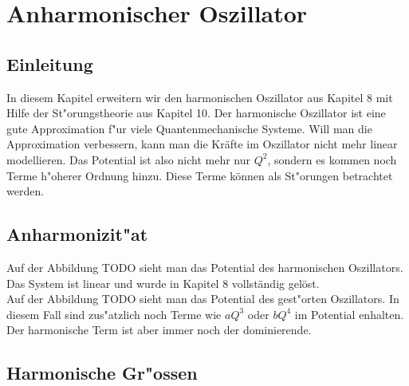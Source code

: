\chapter{Anharmonischer Oszillator\label{chapter:anharmonisch}}
\begin{refsection}

\newpage
\section{Einleitung}
In diesem Kapitel erweitern wir den harmonischen Oszillator aus Kapitel 8 mit Hilfe
der St"orungstheorie aus Kapitel 10. Der harmonische Oszillator ist eine gute
Approximation f"ur viele Quantenmechanische Systeme. Will man die Approximation
verbessern, kann man die Kräfte im Oszillator nicht mehr linear modellieren. Das
Potential ist also nicht mehr nur $Q^2$, sondern es kommen noch Terme h"oherer Ordnung
hinzu. Diese Terme können als St"orungen betrachtet werden.

\section{Anharmonizit"at}

Auf der Abbildung TODO sieht man das Potential des harmonischen Oszillators. Das
System ist linear und wurde in Kapitel 8 vollständig gelöst.\\
Auf der Abbildung TODO sieht man das Potential des gest"orten Oszillators.
In diesem Fall sind zus"atzlich noch Terme wie $aQ^3$ oder $bQ^4$ im Potential
enhalten.
Der harmonische Term ist aber immer noch der dominierende.

\section{Harmonische Gr"ossen}


\end{refsection}

